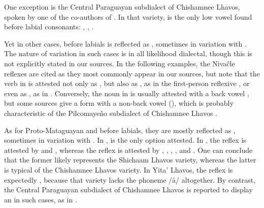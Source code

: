 \begin{exe}
    \ex \arrive
    \ex \cryao
    \ex \returnth
\end{exe}

One exception is the Central Paraguayan subdialect of Chishamnee Lhavos, spoken by one of the co-authors of \citet{LC20}. In that variety,  is the only low vowel found before labial consonants: , ,  .

Yet in other cases,  before labials is reflected as , sometimes in variation with . The nature of variation in such cases is in all likelihood dialectal, though this is not explicitly stated in our sources. In the following examples, the Nivaĉle reflexes are cited as they most commonly appear in our sources, but note that the verb in  is attested not only as , but also as , as in the first-person reflexive  \citep[47]{JS16}, or even as , as in  \citep[111]{LC20}. Conversely, the noun in  is usually attested with a back vowel \citep[254, 277]{AnG15}, but some sources give a form with a non-back vowel (), which is probably characteristic of the Pilcomayeño subdialect of Chishamnee Lhavos \citep[125]{LC20,NS87}. 

\begin{exe}
    \ex \burn \label{ni-ao-a-burn}
    \ex \snail
    \ex {}
    \ex \dinlaw
    \ex \abdcavity
    \ex \spring
    \ex \spin
    \ex \orphanmn \label{ni-ao-a-orphan}
\end{exe}

As for Proto-Mataguayan  and  before labials, they are mostly reflected as , sometimes in variation with . In ,  is the only option attested. In , the reflex  is attested by \citet[111, 395]{NS87} and \citet[40, 64]{AnG15}, whereas the reflex  is attested by \citet[180]{NS87}, \citet[118, 304]{AF16}, \citet[53]{AnG15}, \citet[244]{JS16}, and \citet[127]{LC20}. One can conclude that the former likely represents the Shichaam Lhavos variety, whereas the latter is typical of the Chishamnee Lhavos variety. In Yita' Lhavos, the reflex is expectedly  \citep[50]{AnG15}, because that variety lacks the phoneme /å/ altogether. By contrast, the Central Paraguayan subdialect of Chishamnee Lhavos is reported to display an  in such cases, as in  \citep[73]{LC20}.


